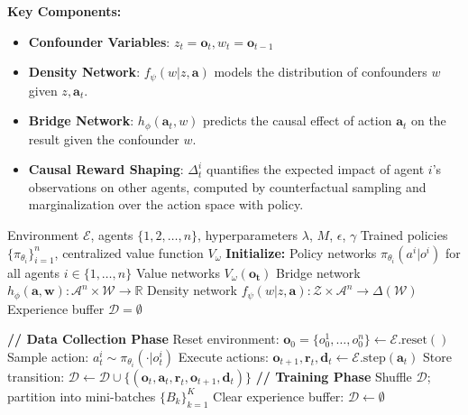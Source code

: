 \documentclass{article}
\begin{document}
\textbf{Key Components:}
\begin{itemize}
\item \textbf{Confounder Variables}: $z_t=\mathbf{o}_t, w_t =\mathbf{o}_{t-1}$ 
\item \textbf{Density Network}: $f_\psi(w| z, \mathbf{a})$ models the distribution of confounders $w$ given $z, \mathbf{a}_t$.
\item \textbf{Bridge Network}: $h_\phi(\mathbf{a}_t, w)$ predicts the causal effect of action $\mathbf{a}_t$ on the result given the confounder $w$.
\item \textbf{Causal Reward Shaping}: $\Delta^i_t$ quantifies the expected impact of agent $i$'s observations on other agents, computed by counterfactual sampling and marginalization over the action space with policy.
\end{itemize}

\begin{algorithm}
\caption{PCI-MAPPO: Main Training Loop}
\label{alg:pci-mappo-main}
\begin{algorithmic}[1]
\Require Environment $\mathcal{E}$, agents $\{1, 2, \ldots, n\}$, hyperparameters $\lambda$, $M$, $\epsilon$, $\gamma$
\Ensure Trained policies $\{\pi_{\theta_i}\}_{i=1}^n$, centralized value function $V_{\omega}$
\State \textbf{Initialize:}
\State \quad Policy networks $\pi_{\theta_i}(a^i | o^i)$ for all agents $i \in \{1, \ldots, n\}$
\State \quad Value networks $V_{\omega}(\mathbf{o_t})$ 
\State \quad Bridge network $h_\phi(\mathbf{a}, \mathbf{w}): \mathcal{A}^n \times \mathcal{W} \rightarrow \mathbb{R}$
\State \quad Density network $f_\psi(w|z,\mathbf{a}): \mathcal{Z} \times \mathcal{A}^n \rightarrow \Delta(\mathcal{W})$
\State \quad Experience buffer $\mathcal{D} = \emptyset$

    \State \textbf{// Data Collection Phase}
        \State Reset environment: $\mathbf{o}_0 = \{o^1_0, \ldots, o^n_0\} \leftarrow \mathcal{E}.\text{reset}()$
                \State Sample action: $a^i_t \sim \pi_{\theta_i}(\cdot | o^i_t)$
            \EndFor
            \State Execute actions: $\mathbf{o}_{t+1}, \mathbf{r}_t, \mathbf{d}_t \leftarrow \mathcal{E}.\text{step}(\mathbf{a}_t)$
            \State Store transition: $\mathcal{D} \leftarrow \mathcal{D} \cup \{(\mathbf{o}_t, \mathbf{a}_t, \mathbf{r}_t, \mathbf{o}_{t+1}, \mathbf{d}_t)\}$
        \EndFor
    \EndFor
    \State \textbf{// Training Phase}
    \State Shuffle $\mathcal{D}$; partition into mini-batches $\{B_k\}_{k=1}^K$
        \State {} 
        \State {} 
    \EndFor
    \State Clear experience buffer: $\mathcal{D} \leftarrow \emptyset$
\EndFor
\end{algorithmic}
\end{algorithm}
\end{document}
